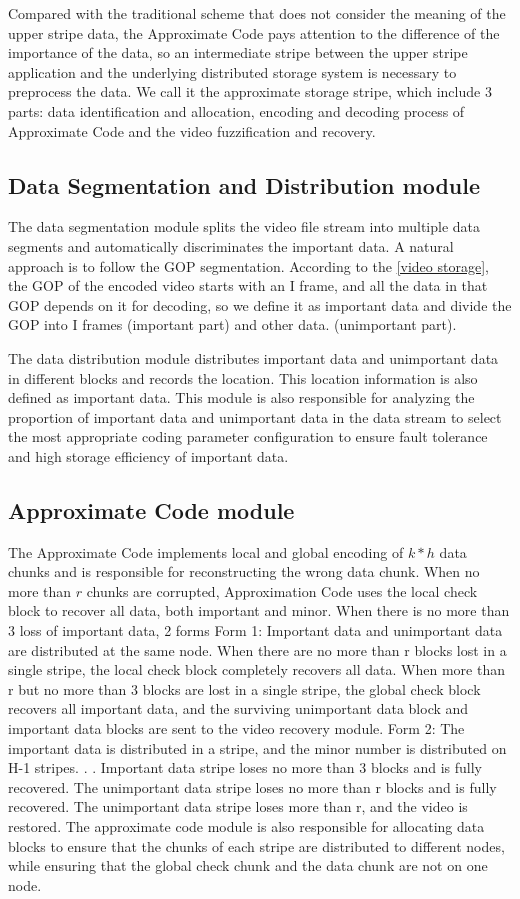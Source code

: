 \documentclass[sigconf]{acmart}
\begin{document}
Compared with the traditional scheme that does not consider the meaning of the upper stripe data, the Approximate Code pays attention to the difference of the importance of the data, so an intermediate stripe between the upper stripe application and the underlying distributed storage system is necessary to preprocess the data. We call it the approximate storage stripe, which include 3 parts: data identification and allocation, encoding and decoding process of Approximate Code and the video fuzzification and recovery.

\subsection{Data Segmentation and Distribution module}
The data segmentation module splits the video file stream into multiple data segments and automatically discriminates the important data. A natural approach is to follow the GOP segmentation. According to the \ref{video storage}, the GOP of the encoded video starts with an I frame, and all the data in that GOP depends on it for decoding, so we define it as important data and divide the GOP into I frames (important part) and other data. (unimportant part).

The data distribution module distributes important data and unimportant data in different blocks and records the location. This location information is also defined as important data. This module is also responsible for analyzing the proportion of important data and unimportant data in the data stream to select the most appropriate coding parameter configuration to ensure fault tolerance and high storage efficiency of important data.

\subsection{Approximate Code module}
The Approximate Code implements local and global encoding of $k*h$ data chunks and is responsible for reconstructing the wrong data chunk. When no more than $r$ chunks are corrupted, Approximation Code uses the local check block to recover all data, both important and minor. When there is no more than 3 loss of important data,
2 forms
Form 1: Important data and unimportant data are distributed at the same node.
When there are no more than r blocks lost in a single stripe, the local check block completely recovers all data.
When more than r but no more than 3 blocks are lost in a single stripe, the global check block recovers all important data, and the surviving unimportant data block and important data blocks are sent to the video recovery module.
Form 2: The important data is distributed in a stripe, and the minor number is distributed on H-1 stripes. . .
Important data stripe loses no more than 3 blocks and is fully recovered.
The unimportant data stripe loses no more than r blocks and is fully recovered.
The unimportant data stripe loses more than r, and the video is restored.
The approximate code module is also responsible for allocating data blocks to ensure that the chunks of each stripe are distributed to different nodes, while ensuring that the global check chunk and the data chunk are not on one node.
\end{document}
